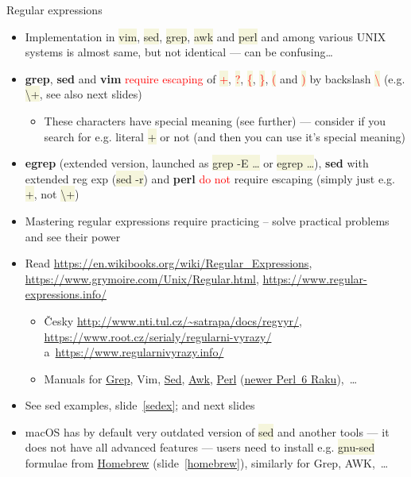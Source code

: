 \documentclass[compress, xelatex, 11pt, xcolor=svgnames, aspectratio=169,
	hyperref={
		bookmarks=true,
		unicode=true,
		colorlinks=true,
		pdftitle={Linux, command line and MetaCentrum},
		plainpages=false,
		pdfauthor={Vojtech Zeisek},
		pdfsubject={Course about use of Linux command line, writing shell scripts and using MetaCentrum of CESNET},
		pdfcreator={XeLaTeX},
		pdfkeywords={Linux, GNU, BASH, shell, command line, MetaCentrum},
		linkcolor=DarkRed, %
		anchorcolor=DarkBlue, %
		citecolor=Indigo, %
		filecolor=NavyBlue, %
		menucolor=DarkMagenta, %
		urlcolor=DarkBlue, %
		},
	url={hyphens, lowtilde} %
	]{beamer}
\renewcommand{\texttt}[1]{\colorbox{Beige}{{\ttfamily #1}}}
\renewcommand{\alert}[1]{\textcolor{red}{#1}}
\begin{document}
\begin{frame}[allowframebreaks]{Regular expressions}
	\label{regexp}
	\begin{itemize}
		\item Implementation in \texttt{vim}, \texttt{sed}, \texttt{grep}, \texttt{awk} and \texttt{perl} and among various UNIX systems is almost same, but not identical --- can be confusing\ldots
		\item \textbf{grep}, \textbf{sed} and \textbf{vim} \alert{require escaping} of \alert{\texttt{+}}, \alert{\texttt{?}}, \alert{\texttt{\{}}, \alert{\texttt{\}}}, \alert{\texttt{(}} and \alert{\texttt{)}} by backslash \alert{\texttt{\textbackslash}} (e.g. \texttt{\textbackslash +}, see also next slides)
		\begin{itemize}
			\item These characters have special meaning (see further) --- consider if you search for e.g. literal \texttt{+} or not (and then you can use it's special meaning)
		\end{itemize}
		\item \textbf{egrep} (extended version, launched as \texttt{grep -E \ldots} or \texttt{egrep \ldots}), \textbf{sed} with extended reg exp (\texttt{sed -r}) and \textbf{perl} \alert{do not} require escaping (simply just e.g. \texttt{+}, not \texttt{\textbackslash +})
		\item Mastering regular expressions require practicing -- solve practical problems and see their power
		\item Read \url{https://en.wikibooks.org/wiki/Regular_Expressions}, \url{https://www.grymoire.com/Unix/Regular.html}, \url{https://www.regular-expressions.info/}
		\begin{itemize}
			\item Česky \url{http://www.nti.tul.cz/~satrapa/docs/regvyr/}, \url{https://www.root.cz/serialy/regularni-vyrazy/} a~\url{https://www.regularnivyrazy.info/}
			\item Manuals for \href{https://www.gnu.org/software/grep/manual/}{Grep}, Vim, \href{https://www.gnu.org/software/sed/manual/}{Sed}, \href{https://www.gnu.org/software/gawk/manual/}{Awk}, \href{https://en.wikibooks.org/wiki/Perl_Programming}{Perl} (\href{https://en.wikibooks.org/wiki/Raku_Programming}{newer Perl~6 Raku}),~\ldots
		\end{itemize}
		\item See sed examples, slide~\ref{sedex}; and next slides
		\item macOS has by default very outdated version of \texttt{sed} and another tools --- it does not have all advanced features --- users need to install e.g. \texttt{gnu-sed} formulae from \href{https://brew.sh/}{Homebrew} (slide~\ref{homebrew}), similarly for Grep, AWK,~\ldots

\end{itemize}
\end{frame}
\end{document}
